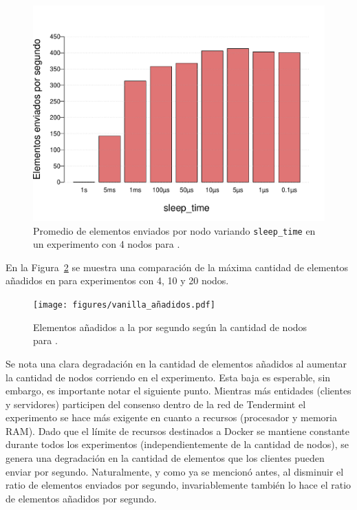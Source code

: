 \begin{figure}
	\centering
	\includegraphics[scale=0.5]{figures/sleep_time_2.pdf}
	\caption{Promedio de elementos enviados por nodo variando \texttt{sleep\_time} en un experimento con 4 nodos para \vanilla.}
	\label{fig:elements_against_sleep_time}
\end{figure}

En la Figura~\ref{fig:vanilla_results} se muestra una comparación de la máxima cantidad de elementos añadidos en \vanilla para experimentos con
4, 10 y 20 nodos.

\begin{figure}
	\centering
	\texttt{[image: figures/vanilla\_añadidos.pdf]}
	\caption{Elementos añadidos a la \setchain por segundo según la cantidad de nodos para \vanilla.}
	\label{fig:vanilla_results}
\end{figure}

Se nota una clara degradación en la cantidad de elementos añadidos al aumentar la cantidad de nodos corriendo en el experimento.
Esta baja es esperable, sin embargo, es importante notar el siguiente punto.
Mientras más entidades (clientes y servidores) participen del consenso dentro de la red de Tendermint el experimento se hace más exigente en cuanto a recursos
(procesador y memoria RAM).
Dado que el límite de recursos destinados a Docker se mantiene constante durante todos los experimentos (independientemente de la cantidad de nodos),
se genera una degradación en la cantidad de elementos que los clientes pueden enviar por segundo.
Naturalmente, y como ya se mencionó antes, al disminuir el ratio de elementos enviados por segundo, invariablemente también lo hace el ratio de
elementos añadidos por segundo.

